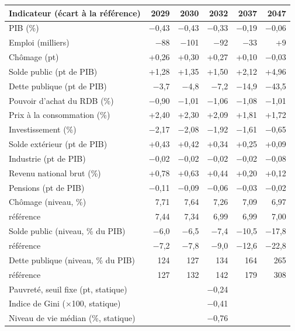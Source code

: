 \begin{tabular}{lrrrrr}
\toprule
Indicateur (écart à la référence) & 2029 & 2030 & 2032 & 2037 & 2047 \\
\midrule
PIB (\%) & $-$0{,}43 & $-$0{,}43 & $-$0{,}33 & $-$0{,}19 & $-$0{,}06 \\
Emploi (milliers) & $-$88 & $-$101 & $-$92 & $-$33 & +9 \\
Chômage (pt) & +0{,}26 & +0{,}30 & +0{,}27 & +0{,}10 & $-$0{,}03 \\
Solde public (pt de PIB) & +1{,}28 & +1{,}35 & +1{,}50 & +2{,}12 & +4{,}96 \\
Dette publique (pt de PIB) & $-$3{,}7 & $-$4{,}8 & $-$7{,}2 & $-$14{,}9 & $-$43{,}5 \\
Pouvoir d'achat du RDB (\%) & $-$0{,}90 & $-$1{,}01 & $-$1{,}06 & $-$1{,}08 & $-$1{,}01 \\
Prix à la consommation (\%) & +2{,}40 & +2{,}30 & +2{,}09 & +1{,}81 & +1{,}72 \\
Investissement (\%) & $-$2{,}17 & $-$2{,}08 & $-$1{,}92 & $-$1{,}61 & $-$0{,}65 \\
Solde extérieur (pt de PIB) & +0{,}43 & +0{,}42 & +0{,}34 & +0{,}25 & +0{,}09 \\
Industrie (pt de PIB) & $-$0{,}02 & $-$0{,}02 & $-$0{,}02 & $-$0{,}02 & $-$0{,}08 \\
Revenu national brut (\%) & +0{,}78 & +0{,}63 & +0{,}44 & +0{,}20 & +0{,}12 \\
Pensions (pt de PIB) & $-$0{,}11 & $-$0{,}09 & $-$0{,}06 & $-$0{,}03 & $-$0{,}02 \\
\midrule
Chômage (niveau, \%) & 7{,}71 & 7{,}64 & 7{,}26 & 7{,}09 & 6{,}97 \\
\quad référence & 7{,}44 & 7{,}34 & 6{,}99 & 6{,}99 & 7{,}00 \\
Solde public (niveau, \% du PIB) & $-$6{,}0 & $-$6{,}5 & $-$7{,}4 & $-$10{,}5 & $-$17{,}8 \\
\quad référence & $-$7{,}2 & $-$7{,}8 & $-$9{,}0 & $-$12{,}6 & $-$22{,}8 \\
Dette publique (niveau, \% du PIB) & 124 & 127 & 134 & 164 & 265 \\
\quad référence & 127 & 132 & 142 & 179 & 308 \\
\midrule
Pauvreté, seuil fixe (pt, statique) & \multicolumn{5}{c}{$-$0{,}24} \\
Indice de Gini ($\times$100, statique) & \multicolumn{5}{c}{$-$0{,}41} \\
Niveau de vie médian (\%, statique) & \multicolumn{5}{c}{$-$0{,}76} \\
\bottomrule
\end{tabular}
